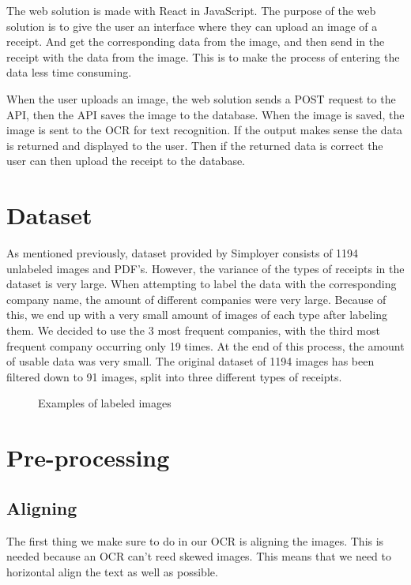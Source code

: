 The web solution is made with React in JavaScript.
The purpose of the web solution is to give the user an interface where they can upload an image of a receipt.
And get the corresponding data from the image, and then send in the receipt with the data from the image.
This is to make the process of entering the data less time consuming.

When the user uploads an image, the web solution sends a POST request to the API, then the API saves the image to
the database.
When the image is saved, the image is sent to the OCR for text recognition.
If the output makes sense the data is returned and displayed to the user.
Then if the returned data is correct the user can then upload the receipt to the database.

\section{Dataset}\label{sec:dataset2}

As mentioned previously, dataset provided by Simployer consists of 1194 unlabeled images and PDF's.
However, the variance of the types of receipts in the dataset is very large.
When attempting to label the data with the corresponding company name, the amount of different companies were very large.
Because of this, we end up with a very small amount of images of each type after labeling them.
We decided to use the 3 most frequent companies, with the third most frequent company occurring only 19 times.
At the end of this process, the amount of usable data was very small.
The original dataset of 1194 images has been filtered down to 91 images, split into three different types of receipts.

\begin{figure}[h]
    \caption{Examples of labeled images}
    \label{fig:figure4.1}
\end{figure}

\section{Pre-processing}\label{pre-processing}

\subsection{Aligning}\label{aligning}

The first thing we make sure to do in our OCR is aligning the images.
This is needed because an OCR can't reed skewed images.
This means that we need to horizontal align the text as well as possible.

